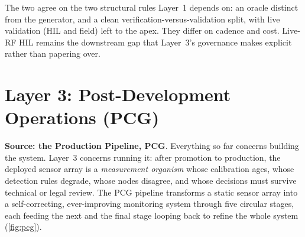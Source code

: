 \documentclass[11pt,a4paper]{article}
\begin{document}
The two agree on the two structural rules Layer~1 depends on: an oracle distinct from the
generator, and a clean verification-versus-validation split, with live validation (HIL and field)
left to the apex. They differ on cadence and cost. Live-RF HIL remains the downstream gap that
Layer~3's governance makes explicit rather than papering over.

\section{Layer 3: Post-Development Operations (PCG)}
\label{sec:layer3}

\textbf{Source: the Production Pipeline, PCG}. Everything so far concerns building the system.
Layer~3 concerns running it: after promotion to production, the deployed sensor array is a
\emph{measurement organism} whose calibration ages, whose detection rules degrade, whose nodes
disagree, and whose decisions must survive technical or legal review. The PCG pipeline
transforms a static sensor array into a self-correcting, ever-improving monitoring system through
five circular stages, each feeding the next and the final stage looping back to refine the whole
system (\cref{fig:pcg}).
\end{document}
